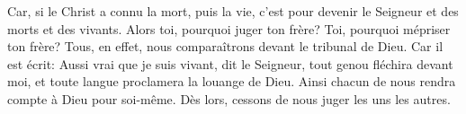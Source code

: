 Car, si le Christ a connu la mort, puis la vie,
	c’est pour devenir le Seigneur et des morts et des vivants.
Alors toi, pourquoi juger ton frère? Toi, pourquoi mépriser ton frère?
	Tous, en effet, nous comparaîtrons devant le tribunal de Dieu.
Car il est écrit: Aussi vrai que je suis vivant, dit le Seigneur,
	tout genou fléchira devant moi,
	et toute langue proclamera la louange de Dieu.
Ainsi chacun de nous rendra compte à Dieu pour soi-même.
	Dès lors, cessons de nous juger les uns les autres.
